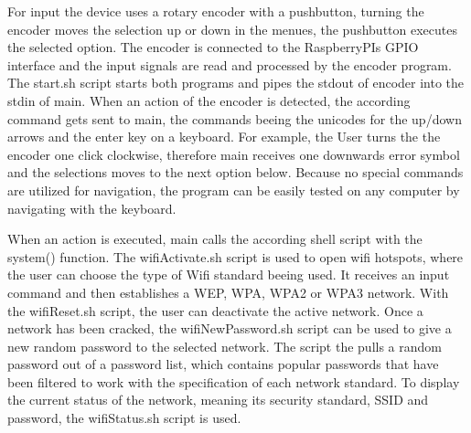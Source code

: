 For input the device uses a rotary encoder with a pushbutton, turning the encoder moves the selection up or down in the menues, the pushbutton executes the selected option.
The encoder is connected to the RaspberryPIs GPIO interface and the input signals are read and processed by the encoder program.
The start.sh script starts both programs and pipes the stdout of encoder into the stdin of main.
When an action of the encoder is detected, the according command gets sent to main, the commands beeing the unicodes for the up/down arrows and the enter key on a keyboard.
For example, the User turns the the encoder one click clockwise, therefore main receives one downwards error symbol and the selections moves to the next option below.
Because no special commands are utilized for navigation, the program can be easily tested on any computer by navigating with the keyboard.

When an action is executed, main calls the according shell script with the system() function.
The wifiActivate.sh script is used to open wifi hotspots, where the user can choose the type of Wifi standard beeing used. 
It receives an input command and then establishes a WEP, WPA, WPA2 or WPA3 network.
With the wifiReset.sh script, the user can deactivate the active network.
Once a network has been cracked, the wifiNewPassword.sh script can be used to give a new random password to the selected network.
The script the pulls a random password out of a password list, which contains popular passwords that have been filtered to work with the specification of each network standard.
To display the current status of the network, meaning its security standard, SSID and password, the wifiStatus.sh script is used.
